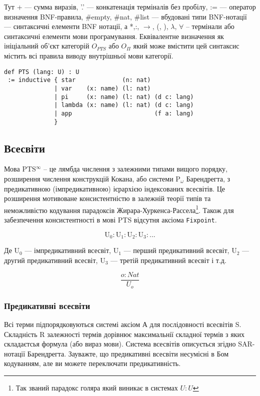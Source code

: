 Тут + --- сумма виразів, '.' --- конкатенація терміналів без пробілу,
:= --- оператор визначення BNF-правила, \#empty, \#nat, \#list --- вбудовані типи BNF-нотації
--- синтаксичні елементи BNF нотації,
а *,:, $\rightarrow$, (, ), $\lambda$, $\forall$ -- термінали або синтаксичні елементи мови програмування.
Еквівалентне визначення як ініціальний об'єкт категорій $O_{PTS}$ або $O_\Pi$
який може вмістити цей синтаксис містить всі правила виводу
внутрішньої мови категорії.

\begin{lstlisting}[mathescape=true]
def PTS (lang: U) : U
 := inductive { star             (n: nat)
              | var    (x: name) (l: nat)
              | pi     (x: name) (l: nat) (d c: lang)
              | lambda (x: name) (l: nat) (d c: lang)
              | app                       (f a: lang)
              }
\end{lstlisting}

\subsection*{Всесвіти}
Мова PTS$^\infty$ -- це лямбда числення з залежними типами вищого порядку,
розширення числення конструкцій Кокана, або системи P$_\omega$ Барендрегта,
з предикативною (імпредикативною) ієрархією індексованих всесвітів.
Це розширення мотивоване консистентністю\cite{Lof75} в залежній теорії типів та
неможливістю кодування парадоксів Жирара-Хуркенса-Рассела\footnote{Так званий парадокс голяра який виникає в системах $U : U$}. Також для
забезпечення консистентності в мові PTS відсутня аксіома \lstinline{Fixpoint}.

$$
    \mathrm{U_0} : \mathrm{U}_1 : \mathrm{U}_2 : \mathrm{U}_3 : ...
$$

Де $\mathrm{U_0}$ --- імпредикативний всесвіт,
   $\mathrm{U_1}$ --- перший предикативний всесвіт,
   $\mathrm{U_2}$ --- другий предикативний всесвіт,
   $\mathrm{U_3}$ --- третій предикативний всесвіт і т.д.

\begin{equation}
\tag{S}
\dfrac
{o : Nat}
{U_o}
\end{equation}

\subsubsection*{Предикативні всесвіти}
Всі терми підпорядковуються системі аксіом А для послідовності всесвітів S.
Складність R залежності термів дорівнює максимальнії складної термів з
яких складаєтсья формула (або вираз мови). Система всесвітів описується
згідно SAR-нотації Барендрегта. Зауважте, що предикативні всесвіти
несумісні в Бом кодуванням, але ви можете переключати предикативність.


